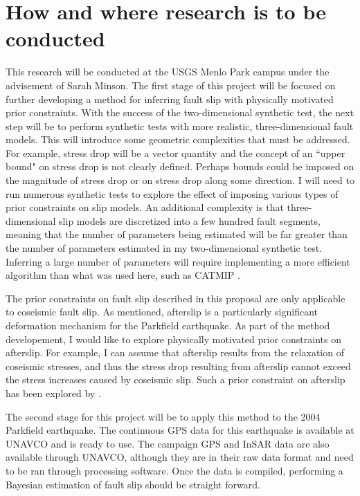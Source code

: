 \documentclass[12pt]{article}
\begin{document}
\section*{How and where research is to be conducted}
This research will be conducted at the USGS Menlo Park campus under the advisement of Sarah Minson.  The first stage of this project will be focused on further developing a method for inferring fault slip with physically motivated prior constraints.  With the success of the two-dimensional synthetic test, the next step will be to perform synthetic tests with more realistic, three-dimensional fault models.  This will introduce some geometric complexities that must be addressed.  For example, stress drop will be a vector quantity and the concept of an ``upper bound" on stress drop is not clearly defined.  Perhaps bounds could be imposed on the magnitude of stress drop or on stress drop along some direction.  I will need to run numerous synthetic tests to explore the effect of imposing various types of prior constraints on slip models.  An additional complexity is that three-dimensional slip models are discretized into a few hundred fault segments, meaning that the number of parameters being estimated will be far greater than the number of parameters estimated in my two-dimensional synthetic test. Inferring a large number of parameters will require implementing a more efficient algorithm than what was used here, such as CATMIP \citep{Minson2013}. 

The prior constraints on fault slip described in this proposal are only applicable to coseismic fault slip.  As mentioned, afterslip is a particularly significant deformation mechanism for the Parkfield earthquake. As part of the method developement, I would like to explore physically motivated prior constraints on afterslip.  For example, I can assume that afterslip results from the relaxation of coseismic stresses, and thus the stress drop resulting from afterslip cannot exceed the stress increases caused by coseismic slip.  Such a prior constraint on afterslip has been explored by \citet{Johnson2012}.  

The second stage for this project will be to apply this method to the 2004 Parkfield earthquake.  The continuous GPS data for this earthquake is available at UNAVCO and is ready to use.  The campaign GPS and InSAR data are also available through UNAVCO, although they are in their raw data format and need to be ran through processing software.  Once the data is compiled, performing a Bayesian estimation of fault slip should be straight forward.        
\end{document}
